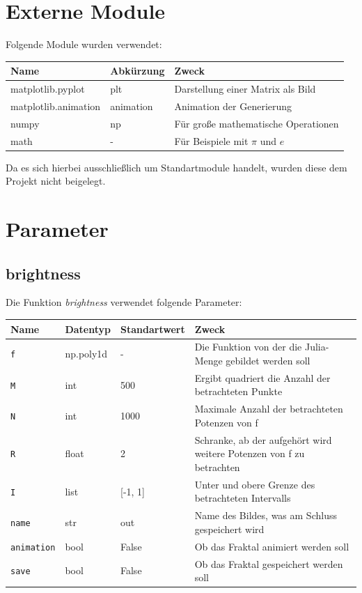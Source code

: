 \documentclass[12pt]{scrartcl}
\begin{document}
\section{Externe Module}
Folgende Module wurden verwendet:
\begin{center}
\begin{tabular}{|p{4cm}|p{2.4cm}|p{7.6cm}|}
\hline
\textbf{Name} & \textbf{Abkürzung} & \textbf{Zweck} \\
\hline \hline
matplotlib.pyplot & plt & Darstellung einer Matrix als Bild \\
\hline
matplotlib.animation & animation & Animation der Generierung \\
\hline
numpy & np & Für große mathematische Operationen \\
\hline
math & - & Für Beispiele mit $\pi$ und $e$\\
\hline
\end{tabular}
\end{center}

Da es sich hierbei ausschließlich um Standartmodule handelt, wurden diese dem Projekt nicht beigelegt.

\section{Parameter}
\subsection{brightness}
Die Funktion \textit{brightness} verwendet folgende Parameter:

\begin{center}
\begin{tabular}{|p{2cm}|p{2cm}|p{2.8cm}|p{7cm}|}
\hline
\textbf{Name} & \textbf{Datentyp} & \textbf{Standartwert} & \textbf{Zweck} \\
\hline \hline
\texttt{f} & np.poly1d & - & Die Funktion von der die Julia-Menge gebildet werden soll \\
\hline
\texttt{M} & int & 500 & Ergibt quadriert die Anzahl der betrachteten Punkte \\
\hline
\texttt{N} & int & 1000 & Maximale Anzahl der betrachteten Potenzen von f \\
\hline
\texttt{R} & float & 2 & Schranke, ab der aufgehört wird weitere Potenzen von f zu betrachten \\
\hline
\texttt{I} & list & [-1, 1] & Unter und obere Grenze des betrachteten Intervalls \\
\hline
\texttt{name} & str & out & Name des Bildes, was am Schluss gespeichert wird \\
\hline
\texttt{animation} & bool & False & Ob das Fraktal animiert werden soll \\
\hline
\texttt{save} & bool & False & Ob das Fraktal gespeichert werden soll \\
\hline
\end{tabular}
\end{center}
\end{document}
